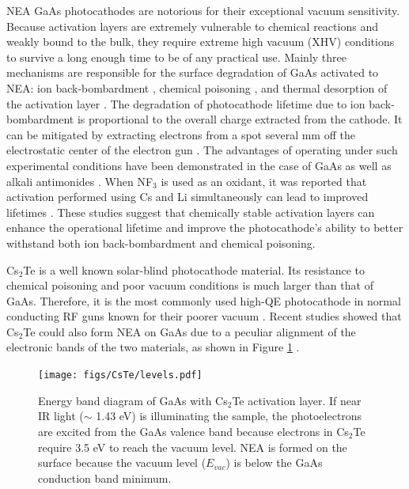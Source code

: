 NEA GaAs photocathodes are notorious for their exceptional vacuum sensitivity. Because activation layers are extremely vulnerable to chemical reactions and weakly bound to the bulk, they require extreme high vacuum (XHV) conditions to survive a long enough time to be of any practical use. Mainly three mechanisms are responsible for the surface degradation of GaAs activated to NEA: ion back-bombardment \cite{grames2011_ChargeFluenceLifetime}, chemical poisoning \cite{chanlek2014_DegradationQuantumEfficiency}, and thermal desorption of the activation layer \cite{kuriki2011_DarklifetimeDegradationGaAs}.
The degradation of photocathode lifetime due to ion back-bombardment is proportional to the overall charge extracted from the cathode. It can be mitigated by extracting electrons from a spot several mm off the electrostatic center of the electron gun \cite{grames2011_ChargeFluenceLifetime}. The advantages of operating under such experimental conditions have been demonstrated in the case of GaAs as well as alkali antimonides \cite{cultrera2011_PhotocathodeBehaviorHigh,mammei2013_ChargeLifetimeMeasurements}.
When NF$_3$ is used as an oxidant, it was reported that activation performed using Cs and Li simultaneously can lead to improved lifetimes \cite{sun2009_SurfaceActivationLayer,mulhollan2008_EnhancedChemicalImmunity}. These studies suggest that chemically stable activation layers can enhance the operational lifetime and improve the photocathode's ability to better withstand both ion back-bombardment and chemical poisoning.

Cs$_2$Te is a well known solar-blind photocathode material. Its resistance to chemical poisoning and poor vacuum conditions is much larger than that of GaAs. Therefore, it is the most commonly used high-QE photocathode in normal conducting RF guns known for their poorer vacuum \cite{michelato2008_Cs2TePHOTOCATHODESROBUSTNESS}.
Recent studies showed that Cs$_2$Te could also form NEA on GaAs due to a peculiar alignment of the electronic bands of the two materials, as shown in Figure \ref{levels} \cite{kuriki2015_GaAsPhotocathodeActivation,sugiyama2011_StudyElectronAffinity,uchida2014_STUDYROBUSTNESSNEAGAAS}.
\begin{figure}
    \centering
    \texttt{[image: figs/CsTe/levels.pdf]}
    \caption{Energy band diagram of GaAs with Cs$_2$Te activation layer. If near IR light ($\sim$ 1.43 eV) is illuminating the sample, the photoelectrons are excited from the GaAs valence band because electrons in Cs$_2$Te require 3.5 eV to reach the vacuum level. NEA is formed on the surface because the vacuum level ($E_{vac}$) is below the GaAs conduction band minimum.}
    \label{levels}
\end{figure}


